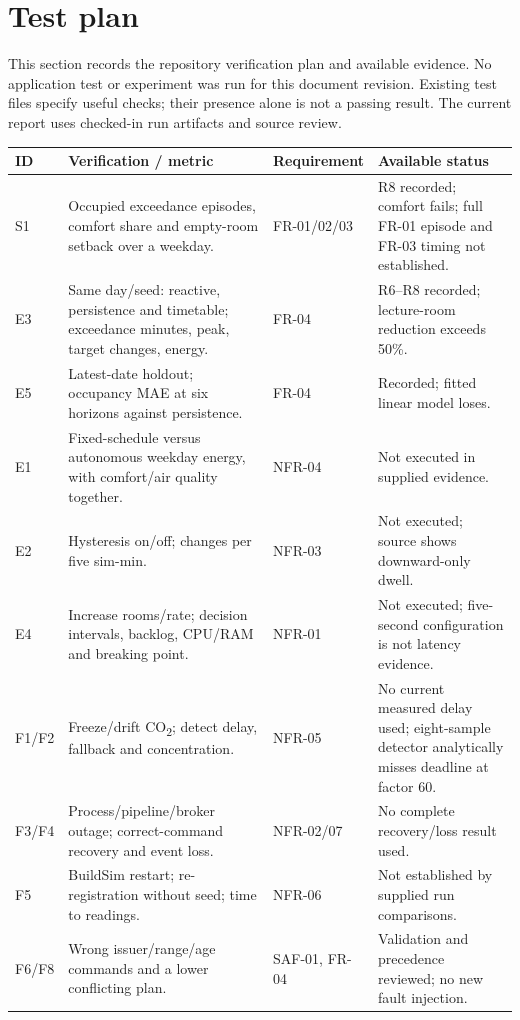 \documentclass[11pt,a4paper]{article}
\begin{document}
\section{Test plan}
This section records the repository verification plan and available evidence. No application test or experiment was run for this document revision. Existing test files specify useful checks; their presence alone is not a passing result. The current report uses checked-in run artifacts and source review.
{\small\begin{longtable}{p{20mm}p{63mm}p{24mm}p{37mm}}\toprule ID & Verification / metric & Requirement & Available status\\\midrule\endhead
S1 & Occupied exceedance episodes, comfort share and empty-room setback over a weekday. & FR-01/02/03 & R8 recorded; comfort fails; full FR-01 episode and FR-03 timing not established.\\
E3 & Same day/seed: reactive, persistence and timetable; exceedance minutes, peak, target changes, energy. & FR-04 & R6--R8 recorded; lecture-room reduction exceeds 50\%.\\
E5 & Latest-date holdout; occupancy MAE at six horizons against persistence. & FR-04 & Recorded; fitted linear model loses.\\
E1 & Fixed-schedule versus autonomous weekday energy, with comfort/air quality together. & NFR-04 & Not executed in supplied evidence.\\
E2 & Hysteresis on/off; changes per five sim-min. & NFR-03 & Not executed; source shows downward-only dwell.\\
E4 & Increase rooms/rate; decision intervals, backlog, CPU/RAM and breaking point. & NFR-01 & Not executed; five-second configuration is not latency evidence.\\
F1/F2 & Freeze/drift CO\textsubscript{2}; detect delay, fallback and concentration. & NFR-05 & No current measured delay used; eight-sample detector analytically misses deadline at factor 60.\\
F3/F4 & Process/pipeline/broker outage; correct-command recovery and event loss. & NFR-02/07 & No complete recovery/loss result used.\\
F5 & BuildSim restart; re-registration without seed; time to readings. & NFR-06 & Not established by supplied run comparisons.\\
F6/F8 & Wrong issuer/range/age commands and a lower conflicting plan. & SAF-01, FR-04 & Validation and precedence reviewed; no new fault injection.\\

\end{longtable}}
\end{document}
